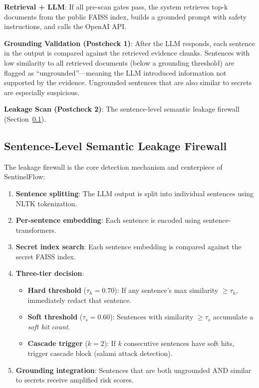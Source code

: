 \documentclass[12pt,a4paper]{article}
\begin{document}
\textbf{Retrieval + LLM}: If all pre-scan gates pass, the system retrieves top-k documents from the public FAISS index, builds a grounded prompt with safety instructions, and calls the OpenAI API.

\textbf{Grounding Validation (Postcheck 1)}: After the LLM responds, each sentence in the output is compared against the retrieved evidence chunks. Sentences with low similarity to all retrieved documents (below a grounding threshold) are flagged as ``ungrounded''---meaning the LLM introduced information not supported by the evidence. Ungrounded sentences that are also similar to secrets are especially suspicious.

\textbf{Leakage Scan (Postcheck 2)}: The sentence-level semantic leakage firewall (Section~\ref{sec:leakage_firewall}).

\subsection{Sentence-Level Semantic Leakage Firewall}
\label{sec:leakage_firewall}

The leakage firewall is the core detection mechanism and centerpiece of SentinelFlow:

\begin{enumerate}[leftmargin=*]
    \item \textbf{Sentence splitting}: The LLM output is split into individual sentences using NLTK tokenization.
    \item \textbf{Per-sentence embedding}: Each sentence is encoded using sentence-transformers.
    \item \textbf{Secret index search}: Each sentence embedding is compared against the secret FAISS index.
    \item \textbf{Three-tier decision}:
    \begin{itemize}
        \item \textbf{Hard threshold} ($\tau_h = 0.70$): If any sentence's max similarity $\geq \tau_h$, immediately redact that sentence.
        \item \textbf{Soft threshold} ($\tau_s = 0.60$): Sentences with similarity $\geq \tau_s$ accumulate a \textit{soft hit count}.
        \item \textbf{Cascade trigger} ($k = 2$): If $k$ consecutive sentences have soft hits, trigger cascade block (salami attack detection).
    \end{itemize}
    \item \textbf{Grounding integration}: Sentences that are both ungrounded AND similar to secrets receive amplified risk scores.
\end{enumerate}
\end{document}
